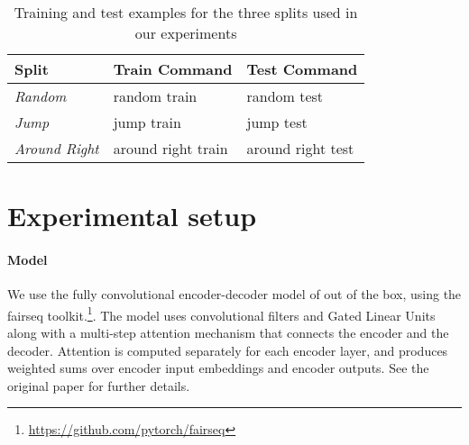 \begin{table*}[t!]
\centering
\begin{tabular}{| l | l | l |}
\hline \textbf{Split} & \textbf{Train Command} & \textbf{Test Command} \\ \hline
\textit{Random} & random train & random test \\
\hline
\textit{Jump} & jump train & jump test \\
\hline
\textit{Around Right} & around right train & around right test \\
\hline
\end{tabular}
\caption{\label{table:examples}  Training and test examples for the three splits used in our experiments }
\end{table*}




\section{Experimental setup}
\paragraph{Model} We use the fully convolutional encoder-decoder model
of  out of the box, using the fairseq 
toolkit.\footnote{\url{https://github.com/pytorch/fairseq}}. The model
uses convolutional filters and Gated Linear Units
\cite{dauphin:etal:2016} along with a multi-step attention mechanism
that connects the encoder and the decoder.  Attention is computed
separately for each encoder layer, and produces weighted sums over
encoder input embeddings and encoder outputs. See the original paper
for further details.


